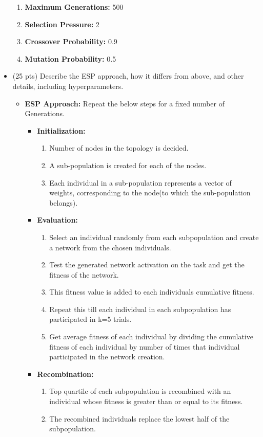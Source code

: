 \documentclass{article}
\begin{document}
\begin{itemize}
\begin{enumerate}
\item \textbf{Maximum Generations:} \color{red}500\color{blue}
\item \textbf{Selection Pressure:} 2
\item \textbf{Crossover Probability:} 0.9
\item \textbf{Mutation Probability:} \color{red}0.5\color{blue}
\end{enumerate}
\color{black}
	\item (25 pts) Describe the ESP approach, how it differs from above, and other details, including hyperparameters.
	\color{blue}
	\begin{itemize}
	\item \textbf{ESP Approach:}
	Repeat the below steps for a fixed number of Generations.
	\begin{itemize}
	\item \textbf{Initialization:}
	\begin{enumerate}
	\item Number of nodes in the topology is decided.
	\item A sub-population is created for each of the nodes.
	\item Each individual in a sub-population represents a vector of weights, corresponding to the node(to which the sub-population belongs).	
	\end{enumerate}
	\item \textbf{Evaluation:}
	\begin{enumerate}
	\item Select an individual randomly from each subpopulation and create a network from the chosen individuals.
	\item Test the generated network activation on the task and get the fitness of the network.
	\item This fitness value is added to each individuals cumulative fitness.
	\item Repeat this till each individual in each subpopulation has participated in k=5 trials.
	\item Get average fitness of each individual by dividing the cumulative fitness of each individual by number of times that individual participated in the network creation.
	\end{enumerate}
	\item \textbf{Recombination:}
	\begin{enumerate}
	\item Top quartile of each subpopulation is recombined with an individual whose fitness is greater than or equal to its fitness.
	\item The recombined individuals replace the lowest half of the subpopulation.
	  

\end{enumerate}
\end{itemize}
\end{itemize}
\end{itemize}
\end{document}
